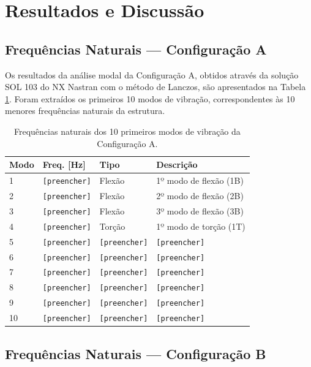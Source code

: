 \documentclass[a4paper,fleqn]{cas-sc}
\begin{document}
\clearpage

\section{Resultados e Discussão}
\label{chap:resultados}

\subsection{Frequências Naturais --- Configuração A}

Os resultados da análise modal da Configuração A, obtidos através da solução SOL 103 do NX Nastran com o método de Lanczos, são apresentados na Tabela \ref{tab:freqs_a}. Foram extraídos os primeiros 10 modos de vibração, correspondentes às 10 menores frequências naturais da estrutura.

\begin{table}
\centering
\caption{Frequências naturais dos 10 primeiros modos de 
vibração da Configuração A.}
\label{tab:freqs_a}
\renewcommand{\arraystretch}{1.4}
\begin{tabularx}{\textwidth}{p{1.5cm} p{3cm} X X}
\toprule
\textbf{Modo} & \textbf{Freq. [\si{\hertz}]} & 
\textbf{Tipo} & \textbf{Descrição} \\
\midrule
1  & \texttt{[preencher]} & Flexão & 1º modo de flexão (1B) \\
2  & \texttt{[preencher]} & Flexão & 2º modo de flexão (2B) \\
3  & \texttt{[preencher]} & Flexão & 3º modo de flexão (3B) \\
4  & \texttt{[preencher]} & Torção & 1º modo de torção (1T) \\
5  & \texttt{[preencher]} & \texttt{[preencher]} & \texttt{[preencher]} \\
6  & \texttt{[preencher]} & \texttt{[preencher]} & \texttt{[preencher]} \\
7  & \texttt{[preencher]} & \texttt{[preencher]} & \texttt{[preencher]} \\
8  & \texttt{[preencher]} & \texttt{[preencher]} & \texttt{[preencher]} \\
9  & \texttt{[preencher]} & \texttt{[preencher]} & \texttt{[preencher]} \\
10 & \texttt{[preencher]} & \texttt{[preencher]} & \texttt{[preencher]} \\
\bottomrule
\end{tabularx}
\end{table}

\subsection{Frequências Naturais --- Configuração B}
\end{document}
